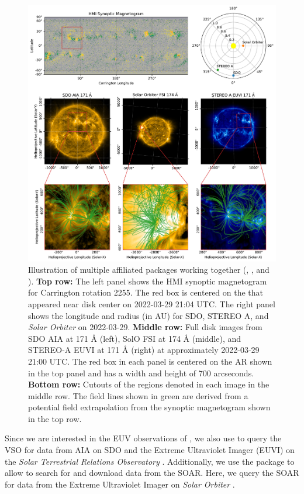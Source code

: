 \begin{figure}
    \centering
    \includegraphics[width=\columnwidth]{figures/loops-multi-viewpoint.pdf}
    \caption{Illustration of multiple affiliated packages working together (\sunpypkg, \aiapypkg, \pfsspypkg and \soarpkg).
             \textbf{Top row:} The left panel shows the HMI synoptic magnetogram for Carrington rotation 2255. The red box is centered on the \AR that appeared near disk center on 2022-03-29 21:04 UTC. The right panel shows the \hgs longitude and radius (in AU) for SDO, STEREO A, and \textit{Solar Orbiter} on 2022-03-29.
             \textbf{Middle row:} Full disk images from SDO AIA at 171 Å (left), SolO FSI at 174 Å (middle), and STEREO-A EUVI at 171 Å (right) at approximately 2022-03-29 21:00 UTC.
             The red box in each panel is centered on the AR shown in the top panel and has a width and height of 700 arcseconds.
             \textbf{Bottom row:} Cutouts of the regions denoted in each image in the middle row.
             The field lines shown in green are derived from a potential field extrapolation from the synoptic magnetogram shown in the top row.
    }
    \label{fig:affiliated-package-showcase}
\end{figure}

Since we are interested in the EUV observations of , we also use \Fido to query the VSO for data from AIA on SDO and the Extreme Ultraviolet Imager (EUVI) on the \textit{Solar Terrestrial Relations Observatory} \citep[STEREO,][]{howard_sun_2008}.
Additionally, we use the  package to allow \Fido to search for and download data from the SOAR.
Here, we query the SOAR for data from the Extreme Ultraviolet Imager \citep[EUI,][]{rochus_solar_2020} on \textit{Solar Orbiter} \citep{muller_solar_2020}.

